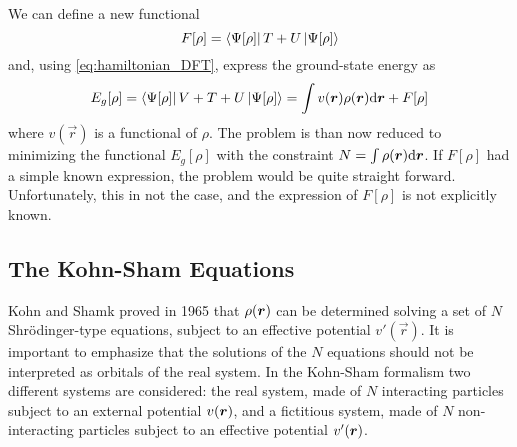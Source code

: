 We can define a new functional
\begin{equation}
    F[\rho] = \bra{\Psi[\rho]} T+U \ket{\Psi[\rho]}
\end{equation}
and, using \cref{eq:hamiltonian_DFT}, express the ground-state energy as
\begin{equation} \label{eq:ground_functional}
    E_g[\rho] = \bra{\Psi[\rho]} V+T+U \ket{\Psi[\rho]} = \int v(\vec{r}) \rho(\vec{r}) \differential \vec{r} + F[\rho]
\end{equation}
where $v(\vec{r})$ is a functional of $\rho$. The problem is than now reduced to minimizing the functional $E_g[\rho]$ with the constraint $N = \int \rho(\vec{r}) \differential \vec{r}$. If $F[\rho]$ had a simple known expression, the problem would be quite straight forward. Unfortunately, this in not the case, and the expression of $F[\rho]$ is not explicitly known.

\subsection{The Kohn-Sham Equations}
Kohn and Shamk proved in 1965 that $\rho(\mathbf{\boldsymbol{r}})$ can be determined solving a set of $N$ Shr\"{o}dinger-type equations, subject to an effective potential $v'(\vec{r})$. It is important to emphasize that the solutions of the $N$ equations should not be interpreted as orbitals of the real system. In the Kohn-Sham formalism two different systems are considered: the real system, made of $N$ interacting particles subject to an external potential $v(\mathbf{\boldsymbol{r}})$, and a fictitious system, made of $N$ non-interacting particles subject to an effective potential $v'(\mathbf{\boldsymbol{r}})$.

